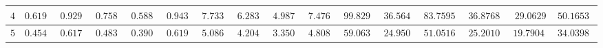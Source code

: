 \begin{landscape}
\begin{tabular}{|c|c|c|c|c|c|c|c|c|c|c|c|c|c|c|c}
$4$          & $0.6191$                                                        & $0.9295$                                                        & $0.7588$                                                          & $0.5884$                                                           & $0.9434$                                                              & $7.7336$                                                        & $6.2833$                                                          & $4.9878$                                                           & $7.4763$                                                              & $99.8299$                                                       & $36.5641$                                                         & $83.75953$                                                       & $36.87686$                                                         & $29.0629$                                                          & \multicolumn{1}{c|}{$50.16533$}                                                             \\ \hline
$5$          & $0.4547$                                                        & $0.6173$                                                        & $0.4831$                                                          & $0.3909$                                                           & $0.6195$                                                              & $5.0868$                                                        & $4.2045$                                                          & $3.3503$                                                           & $4.8088$                                                              & $59.0631$                                                       & $24.9509$                                                         & $51.05168$                                                       & $25.20103$                                                         & $19.79046$                                                          & \multicolumn{1}{c|}{$34.03985$}                                                             \\ \hline

\end{tabular}
\end{landscape}

